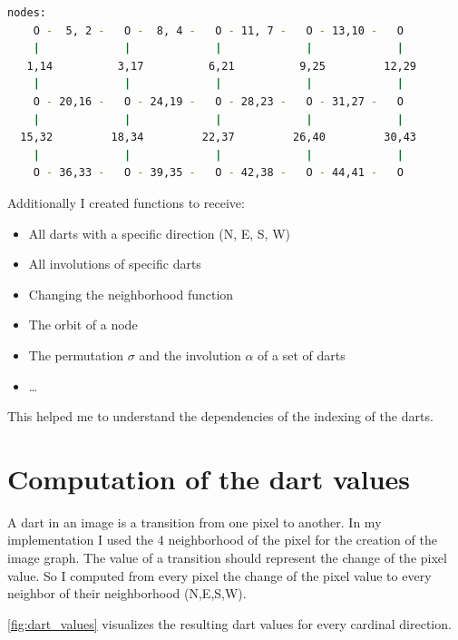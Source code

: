\documentclass[12pt]{article}
\begin{document}
\begin{lstlisting}[caption={The output of the commands of \cref{lst:python}},label={lst:output_python},language=bash,float,floatplacement=H,basicstyle=\scriptsize]
nodes:
    O -  5, 2 -   O -  8, 4 -   O - 11, 7 -   O - 13,10 -   O
    |             |             |             |             |
   1,14          3,17          6,21          9,25         12,29
    |             |             |             |             |
    O - 20,16 -   O - 24,19 -   O - 28,23 -   O - 31,27 -   O
    |             |             |             |             |
  15,32         18,34         22,37         26,40         30,43
    |             |             |             |             |
    O - 36,33 -   O - 39,35 -   O - 42,38 -   O - 44,41 -   O
\end{lstlisting}

Additionally I created functions to receive:
\begin{itemize}
  \item All darts with a specific direction (N, E, S, W)
  \item All involutions of specific darts
  \item Changing the neighborhood function
  \item The orbit of a node
  \item The permutation \( \sigma \) and the involution \( \alpha \) of a set of darts
  \item \ldots
\end{itemize}


This helped me to understand the dependencies of the indexing of the darts.


\section{Computation of the dart values}%
\label{sec:computation_of_the_dart_values}

A dart in an image is a transition from one pixel to another. In my implementation I used the 4 neighborhood of the pixel for the creation of the image graph.
The value of a transition should represent the change of the pixel value.
So I computed from every pixel the change of the pixel value to every neighbor of their neighborhood (N,E,S,W).
\par
\cref{fig:dart_values} visualizes the resulting dart values for every cardinal direction.
\end{document}
